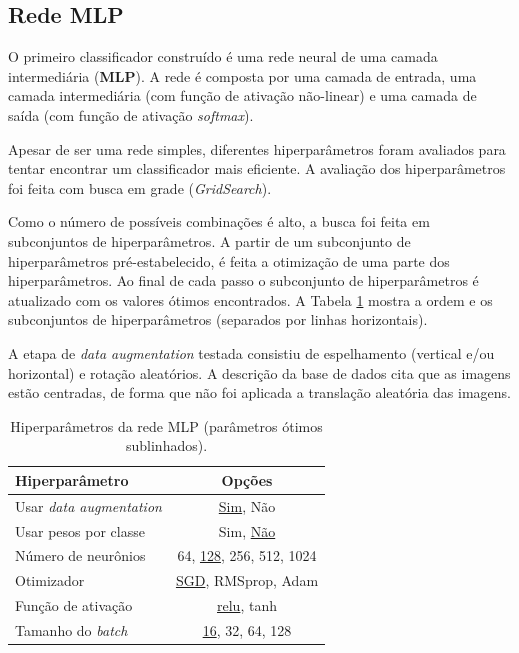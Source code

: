 \documentclass[final,5p]{elsarticle}
\numberwithin{equation}{section}
\begin{document}
    \subsection{Rede MLP}

    O primeiro classificador construído é uma rede neural de uma camada intermediária (\textbf{MLP}). A rede é composta por uma camada de entrada, uma camada intermediária (com função de ativação não-linear) e uma camada de saída (com função de ativação \emph{softmax}).

    Apesar de ser uma rede simples, diferentes hiperparâmetros foram avaliados para tentar encontrar um classificador mais eficiente. A avaliação dos hiperparâmetros foi feita com busca em grade (\emph{GridSearch}).

    Como o número de possíveis combinações é alto, a busca foi feita em subconjuntos de hiperparâmetros. A partir de um subconjunto de hiperparâmetros pré-estabelecido, é feita a otimização de uma parte dos hiperparâmetros. Ao final de cada passo o subconjunto de hiperparâmetros é atualizado com os valores ótimos encontrados. A Tabela \ref{tab:ParametrosMLP} mostra a ordem e os subconjuntos de hiperparâmetros (separados por linhas horizontais).

    A etapa de \emph{data augmentation} testada consistiu de espelhamento (vertical e/ou horizontal) e rotação aleatórios. A descrição da base de dados cita que as imagens estão centradas, de forma que não foi aplicada a translação aleatória das imagens.

    \begin{table}[h]
        \centering
        \begin{tabular}{l c}
            \toprule
            \textbf{Hiperparâmetro} & \textbf{Opções} \\
            \midrule
            Usar \emph{data augmentation} & \underline{Sim}, Não \\
            Usar pesos por classe & Sim, \underline{Não} \\
            \midrule
            Número de neurônios & 64, \underline{128}, 256, 512, 1024 \\
            \midrule
            Otimizador & \underline{SGD}, RMSprop, Adam \\
            Função de ativação & \underline{relu}, tanh \\
            Tamanho do \emph{batch} & \underline{16}, 32, 64, 128 \\
            \bottomrule
        \end{tabular}
        \caption{Hiperparâmetros da rede MLP (parâmetros ótimos sublinhados).}\label{tab:ParametrosMLP}
    \end{table}
\end{document}
